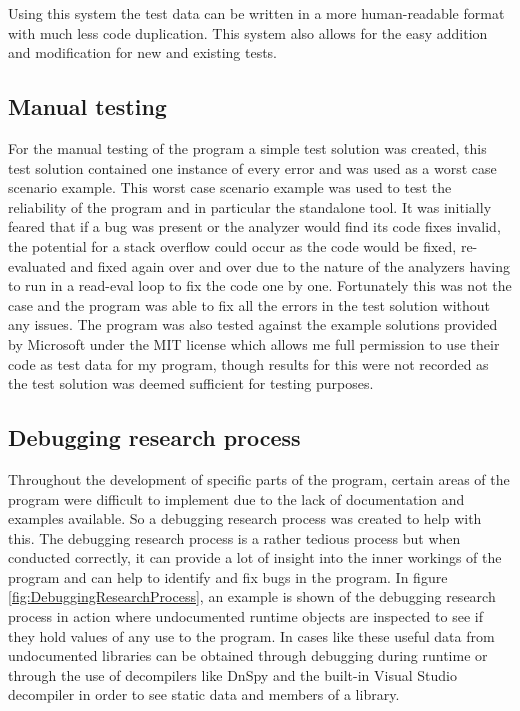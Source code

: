 Using this system the test data can be written in a more human-readable format with much less code duplication. This system also allows for the easy addition and modification for new and existing tests.

\subsection*{Manual testing}
\label{sec:StandaloneToolTests}
For the manual testing of the program a simple test solution was created, this test solution contained one instance of every error and was used as a worst case scenario example. This worst case scenario example was used to test the reliability of the program and in particular the standalone tool. It was initially feared that if a bug was present or the analyzer would find its code fixes invalid, the potential for a stack overflow could occur as the code would be fixed, re-evaluated and fixed again over and over due to the nature of the analyzers having to run in a read-eval loop to fix the code one by one. Fortunately this was not the case and the program was able to fix all the errors in the test solution without any issues. The program was also tested against the example solutions provided by Microsoft under the MIT license which allows me full permission to use their code as test data for my program, though results for this were not recorded as the test solution was deemed sufficient for testing purposes.

\subsection*{Debugging research process}
\label{sec:DebuggingResearchProcess}
Throughout the development of specific parts of the program, certain areas of the program were difficult to implement due to the lack of documentation and examples available. So a debugging research process was created to help with this. The debugging research process is a rather tedious process but when conducted correctly, it can provide a lot of insight into the inner workings of the program and can help to identify and fix bugs in the program. In figure \ref{fig:DebuggingResearchProcess}, an example is shown of the debugging research process in action where undocumented runtime objects are inspected to see if they hold values of any use to the program. In cases like these useful data from undocumented libraries can be obtained through debugging during runtime or through the use of decompilers like DnSpy and the built-in Visual Studio decompiler in order to see static data and members of a library.

